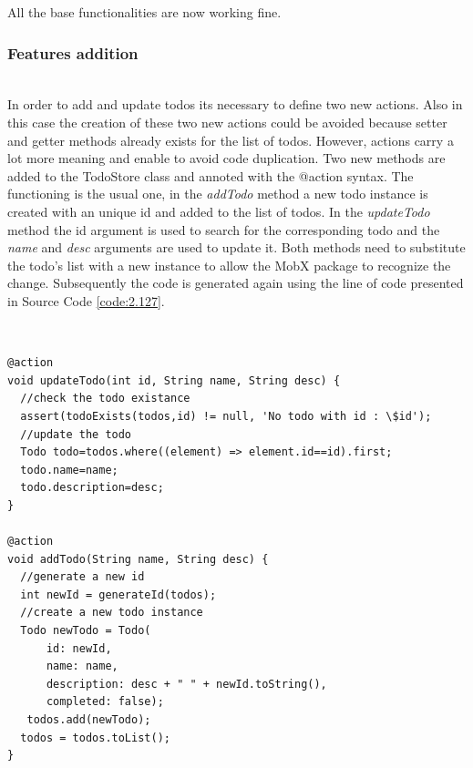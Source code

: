 All the base functionalities are now working fine.
\subsubsection{Features addition} \mbox{}\\ \label{par:todo_app_inherited_widget_introduction}In order to add and update todos its necessary to define two new actions. Also in this case the creation of these two new actions could be avoided because setter and getter methods already exists for the list of todos. However,  actions carry a lot more meaning and enable to avoid code duplication. Two new methods are added to the TodoStore class and annoted with the @action syntax. The functioning is the usual one, in the \textit{addTodo} method a new todo instance is created with an unique id and added to the list of todos. In the \textit{updateTodo} method the id argument is used to search for the corresponding todo and the \textit{name} and \textit{desc} arguments are used to update it. Both methods need to substitute the todo’s list with a new instance to allow the MobX package to recognize the change. Subsequently the code is generated again using the line of code presented in Source Code \ref{code:2.127}.
\begin{code}
\mbox{}\\
 \mbox{}
		\label{code:2.14}
\begin{verbatim}
@action
void updateTodo(int id, String name, String desc) {
  //check the todo existance
  assert(todoExists(todos,id) != null, 'No todo with id : \$id');
  //update the todo
  Todo todo=todos.where((element) => element.id==id).first;
  todo.name=name;
  todo.description=desc;
}
 
@action
void addTodo(String name, String desc) {
  //generate a new id
  int newId = generateId(todos);
  //create a new todo instance
  Todo newTodo = Todo(
      id: newId,
      name: name,
      description: desc + " " + newId.toString(),
      completed: false);
   todos.add(newTodo);
  todos = todos.toList();
}
\end{verbatim}
\mbox{}
\end{code}

